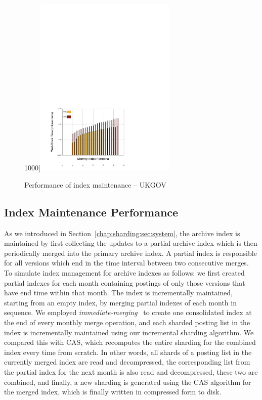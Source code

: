 \begin{figure}[]
  1000]{\label{fig:ukgov_index_merge_1000.0}\includegraphics[width=0.6\textwidth]{plots/updates/pdfs/index_maintenance_ukgov_1000.pdf}}
  \caption{Performance of index maintenance -- UKGOV}
  \label{fig:imukgov}
\end{figure}

\subsection{Index Maintenance Performance}

As we introduced in Section~\ref{chap:sharding:sec:system}, the archive index is maintained by first collecting the updates to a partial-archive index which is then periodically merged into the primary archive index. A partial index is responsible for all versions which end in the time interval between two consecutive merges. To simulate index management for archive indexes as follows: we first created partial indexes for each month containing postings of only those versions that have end time within that month. The index is incrementally maintained, starting from an empty
index, by merging partial indexes of each month in sequence. We employed
\emph{immediate-merging}~\cite{Buttcher:2010fk} to create one
consolidated index at the end of every monthly merge operation, and
each sharded posting list in the index is incrementally maintained
using our incremental sharding algorithm. We compared this with CAS, which
recomputes the entire sharding for the combined index every time from
scratch. In other words, all shards of a posting list in the currently
merged index are read and decompressed, the corresponding list from
the partial index for the next month is also read and decompressed,
these two are combined, and finally, a new sharding is generated using
the CAS algorithm for the merged index, which is finally written in compressed
form to disk.

